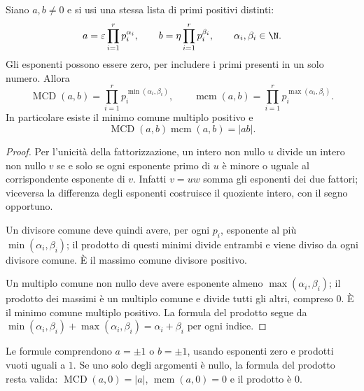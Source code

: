 \begin{proposizione}\label{prop:mcd-mcm}
Siano $a,b\ne0$ e si usi una stessa lista di primi positivi distinti:
\[
a=\varepsilon\prod_{i=1}^r p_i^{\alpha_i},\qquad
b=\eta\prod_{i=1}^r p_i^{\beta_i},\qquad\alpha_i,\beta_i\in\N.
\]
Gli esponenti possono essere zero, per includere i primi presenti in un solo numero. Allora
\[
\operatorname{MCD}(a,b)=\prod_{i=1}^r p_i^{\min(\alpha_i,\beta_i)},
\qquad
\operatorname{mcm}(a,b)=\prod_{i=1}^r p_i^{\max(\alpha_i,\beta_i)}.
\]
In particolare esiste il minimo comune multiplo positivo e
\[
\operatorname{MCD}(a,b)\operatorname{mcm}(a,b)=|ab|.
\]
\end{proposizione}
\begin{proof}
Per l'unicità della fattorizzazione, un intero non nullo $u$ divide un intero non nullo $v$ se e solo se ogni esponente primo di $u$ è minore o uguale al corrispondente esponente di $v$. Infatti $v=uw$ somma gli esponenti dei due fattori; viceversa la differenza degli esponenti costruisce il quoziente intero, con il segno opportuno.

Un divisore comune deve quindi avere, per ogni $p_i$, esponente al più $\min(\alpha_i,\beta_i)$; il prodotto di questi minimi divide entrambi e viene diviso da ogni divisore comune. È il massimo comune divisore positivo.

Un multiplo comune non nullo deve avere esponente almeno $\max(\alpha_i,\beta_i)$; il prodotto dei massimi è un multiplo comune e divide tutti gli altri, compreso $0$. È il minimo comune multiplo positivo. La formula del prodotto segue da $\min(\alpha_i,\beta_i)+\max(\alpha_i,\beta_i)=\alpha_i+\beta_i$ per ogni indice.
\end{proof}

\begin{osservazione}
Le formule comprendono $a=\pm1$ o $b=\pm1$, usando esponenti zero e prodotti vuoti uguali a $1$. Se uno solo degli argomenti è nullo, la formula del prodotto resta valida: $\operatorname{MCD}(a,0)=|a|$, $\operatorname{mcm}(a,0)=0$ e il prodotto è $0$.
\end{osservazione}

